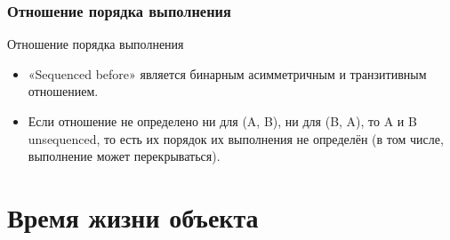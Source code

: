 \documentclass[xetex,mathserif,serif,10pt]{beamer}
\begin{document}
    \subsubsection{Отношение порядка выполнения}
    \begin{frame}{Отношение порядка выполнения}
        \begin{itemize}
            \item «Sequenced before» является бинарным асимметричным и транзитивным отношением.
            \item Если отношение не определено ни для (A, B), ни для (B, A), то A и B unsequenced,
                то есть их порядок их выполнения не определён (в том числе, выполнение может перекрываться).
        \end{itemize}
    \end{frame}
    \section{Время жизни объекта}
\end{document}
